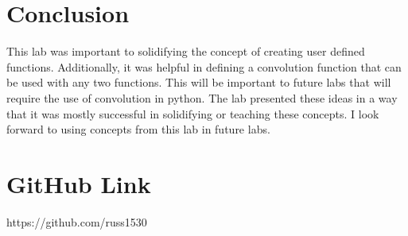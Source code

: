 \documentclass[12pt, titlepage]{article}
\begin{document}
        \section{Conclusion}
       This lab was important to solidifying the concept of creating user defined functions.  Additionally, it was helpful in defining a convolution function that can be used with any two functions.  This will be important to future labs that will require the use of convolution in python. The lab presented these ideas in a way that it was mostly successful in solidifying or teaching these concepts.  I look forward to using concepts from this lab in future labs. 
        
        \section{GitHub Link}
        https://github.com/russ1530
\end{document}
